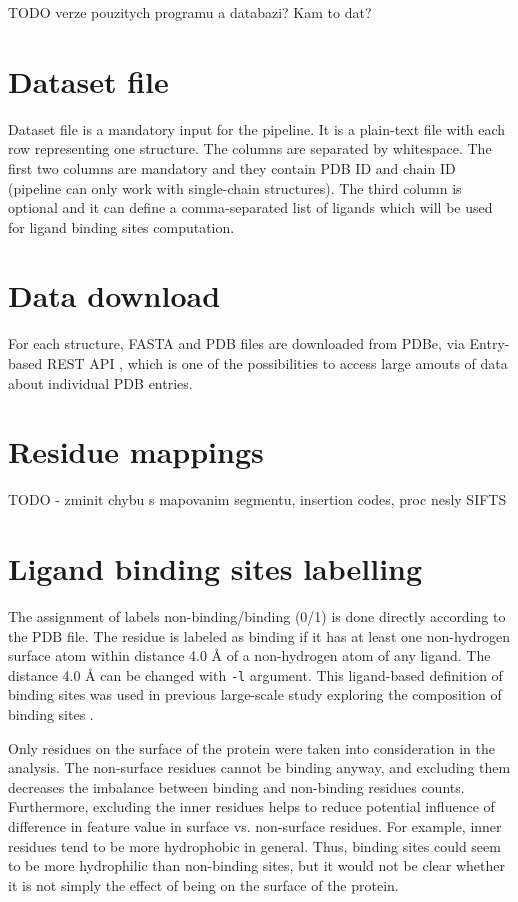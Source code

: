 TODO verze pouzitych programu a databazi? Kam to dat?

\section{Dataset file}
Dataset file is a mandatory input for the pipeline. It is a plain-text file with each row representing one structure. The columns are separated by whitespace. The first two columns are mandatory and they contain PDB ID and chain ID (pipeline can only work with single-chain structures). The third column is optional and it can define a comma-separated list of ligands which will be used for ligand binding sites computation.

\section{Data download}

For each structure, FASTA and PDB files are downloaded from PDBe, via Entry-based REST API \cite{pdbe_restapi}, which is one of the possibilities to access large amouts of data about individual PDB entries.

\section{Residue mappings}
TODO
- zminit chybu s mapovanim segmentu, insertion codes, proc nesly SIFTS

\section{Ligand binding sites labelling}

The assignment of labels non-binding/binding (0/1) is done directly according to the PDB file. The residue is labeled as binding if it has at least one non-hydrogen surface atom within distance 4.0 {\AA} of a non-hydrogen atom of any ligand. The distance 4.0 {\AA} can be changed with \texttt{-l} argument. This ligand-based definition of binding sites was used in previous large-scale study exploring the composition of binding sites \cite{lbscomposition}.

Only residues on the surface of the protein were taken into consideration in the analysis. The non-surface residues cannot be binding anyway, and excluding them decreases the imbalance between binding and non-binding residues counts. Furthermore, excluding the inner residues helps to reduce potential influence of  difference in feature value in surface vs. non-surface residues. For example, inner residues tend to be more hydrophobic in general. Thus, binding sites could seem to be more hydrophilic than non-binding sites, but it would not be clear whether it is not simply the effect of being on the surface of the protein.

